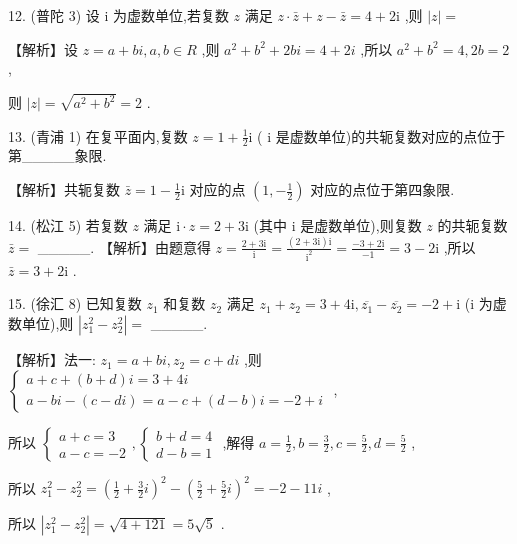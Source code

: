 \documentclass[10pt]{article}
\begin{document}
12. (普陀 3) 设 \(\mathrm{i}\) 为虚数单位,若复数 \(z\) 满足 \(z \cdot  \bar{z} + z - \bar{z} = 4 + 2\mathrm{i}\) ,则 \(\left| z\right|  =\)

【解析】设 \(z = a + {bi},a,b \in  R\) ,则 \({a}^{2} + {b}^{2} + {2bi} = 4 + {2i}\) ,所以 \({a}^{2} + {b}^{2} = 4,{2b} = 2\) ,

则 \(\left| z\right|  = \sqrt{{a}^{2} + {b}^{2}} = 2\) .

13. (青浦 1) 在复平面内,复数 \(z = 1 + \frac{1}{2}\mathrm{i}\) ( \(\mathrm{i}\) 是虚数单位)的共轭复数对应的点位于第\_\_\_\_\_象限.

【解析】共轭复数 \(\bar{z} = 1 - \frac{1}{2}\mathrm{i}\) 对应的点 \(\left( {1, - \frac{1}{2}}\right)\) 对应的点位于第四象限.

14. (松江 5) 若复数 \(z\) 满足 \(\mathrm{i} \cdot  z = 2 + 3\mathrm{i}\) (其中 \(\mathrm{i}\) 是虚数单位),则复数 \(z\) 的共轭复数 \(\bar{z} =\) \_\_\_\_\_. 【解析】由题意得 \(z = \frac{2 + 3\mathrm{i}}{\mathrm{i}} = \frac{\left( {2 + 3\mathrm{i}}\right) \mathrm{i}}{{\mathrm{i}}^{2}} = \frac{-3 + 2\mathrm{i}}{-1} = 3 - 2\mathrm{i}\) ,所以 \(\bar{z} = 3 + 2\mathrm{i}\) .

15. (徐汇 8) 已知复数 \({z}_{1}\) 和复数 \({z}_{2}\) 满足 \({z}_{1} + {z}_{2} = 3 + 4\mathrm{i},\overline{{z}_{1}} - \overline{{z}_{2}} =  - 2 + \mathrm{i}\) (i 为虚数单位),则 \(\left| {{z}_{1}^{2} - {z}_{2}^{2}}\right|  =\) \_\_\_\_\_.

【解析】法一: \({z}_{1} = a + {bi},{z}_{2} = c + {di}\) ,则 \(\left\{  \begin{array}{l} a + c + \left( {b + d}\right) i = 3 + {4i} \\  a - {bi} - \left( {c - {di}}\right)  = a - c + \left( {d - b}\right) i =  - 2 + i \end{array}\right.\) ,

所以 \(\left\{  {\begin{array}{l} a + c = 3 \\  a - c =  - 2 \end{array},\left\{  \begin{array}{l} b + d = 4 \\  d - b = 1 \end{array}\right. }\right.\) ,解得 \(a = \frac{1}{2},b = \frac{3}{2},c = \frac{5}{2},d = \frac{5}{2}\) ,

所以 \({z}_{1}^{2} - {z}_{2}^{2} = {\left( \frac{1}{2} + \frac{3}{2}i\right) }^{2} - {\left( \frac{5}{2} + \frac{5}{2}i\right) }^{2} =  - 2 - {11i}\) ,

所以 \(\left| {{z}_{1}^{2} - {z}_{2}^{2}}\right|  = \sqrt{4 + {121}} = 5\sqrt{5}\) .
\end{document}
